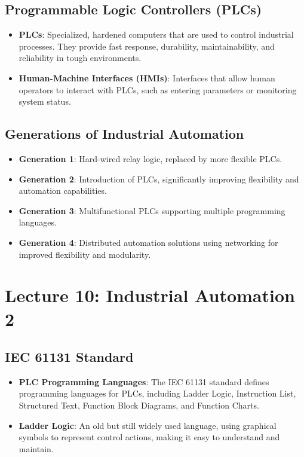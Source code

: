 \documentclass[
  14pt,
  a4paper,
  DIV=11,
  numbers=noendperiod,
  headinclude=true,
  footinclude=true]{scrreprt}
\providecommand{\tightlist}{%
  \setlength{\itemsep}{0pt}\setlength{\parskip}{0pt}}\usepackage{longtable,booktabs,array}
\begin{document}
\section{Programmable Logic Controllers
(PLCs)}\label{programmable-logic-controllers-plcs}

\begin{itemize}
\tightlist
\item
  \textbf{PLCs}: Specialized, hardened computers that are used to
  control industrial processes. They provide fast response, durability,
  maintainability, and reliability in tough environments.
\item
  \textbf{Human-Machine Interfaces (HMIs)}: Interfaces that allow human
  operators to interact with PLCs, such as entering parameters or
  monitoring system status.
\end{itemize}

\section{Generations of Industrial
Automation}\label{generations-of-industrial-automation}

\begin{itemize}
\tightlist
\item
  \textbf{Generation 1}: Hard-wired relay logic, replaced by more
  flexible PLCs.
\item
  \textbf{Generation 2}: Introduction of PLCs, significantly improving
  flexibility and automation capabilities.
\item
  \textbf{Generation 3}: Multifunctional PLCs supporting multiple
  programming languages.
\item
  \textbf{Generation 4}: Distributed automation solutions using
  networking for improved flexibility and modularity.
\end{itemize}

\chapter{Lecture 10: Industrial Automation
2}\label{lecture-10-industrial-automation-2}

\section{IEC 61131 Standard}\label{iec-61131-standard}

\begin{itemize}
\tightlist
\item
  \textbf{PLC Programming Languages}: The IEC 61131 standard defines
  programming languages for PLCs, including Ladder Logic, Instruction
  List, Structured Text, Function Block Diagrams, and Function Charts.
\item
  \textbf{Ladder Logic}: An old but still widely used language, using
  graphical symbols to represent control actions, making it easy to
  understand and maintain.
\end{itemize}
\end{document}
